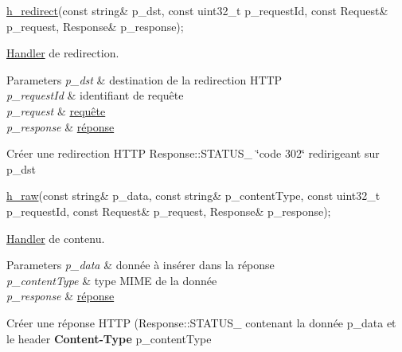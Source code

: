 \begin{DoxyItemize}
\item 
\begin{DoxyCode}
\hyperlink{classxtd_1_1network_1_1http_1_1Server_a172fc1cfb74fb3ca9930b1285ba80f9d}{h\_redirect}(\textcolor{keyword}{const} \textcolor{keywordtype}{string}& p\_dst, \textcolor{keyword}{const} uint32\_t p\_requestId, \textcolor{keyword}{const} Request& p\_request, Response& 
      p\_response); 
\end{DoxyCode}
 \hyperlink{classxtd_1_1network_1_1http_1_1Server_1_1Handler}{Handler} de redirection. 
\begin{DoxyParams}{Parameters}
{\em p\+\_\+dst} & destination de la redirection H\+T\+TP \\
\hline
{\em p\+\_\+request\+Id} & identifiant de requête \\
\hline
{\em p\+\_\+request} & \hyperlink{classxtd_1_1network_1_1http_1_1Request}{requête} \\
\hline
{\em p\+\_\+response} & \hyperlink{classxtd_1_1network_1_1http_1_1Response}{réponse}\\
\hline
\end{DoxyParams}
Créer une redirection H\+T\+TP Response\+::\+S\+T\+A\+T\+U\+S\+\_ \char`\"{}code 302\char`\"{} redirigeant sur p\+\_\+dst
\item 
\begin{DoxyCode}
\hyperlink{classxtd_1_1network_1_1http_1_1Server_a39fef0364300dcc2ff7391c821d5310d}{h\_raw}(\textcolor{keyword}{const} \textcolor{keywordtype}{string}& p\_data, \textcolor{keyword}{const} \textcolor{keywordtype}{string}& p\_contentType, \textcolor{keyword}{const} uint32\_t p\_requestId, \textcolor{keyword}{const} Request& 
      p\_request, Response& p\_response); 
\end{DoxyCode}
 \hyperlink{classxtd_1_1network_1_1http_1_1Server_1_1Handler}{Handler} de contenu. 
\begin{DoxyParams}{Parameters}
{\em p\+\_\+data} & donnée à insérer dans la réponse \\
\hline
{\em p\+\_\+content\+Type} & type M\+I\+ME de la donnée \\
\hline
{\em p\+\_\+response} & \hyperlink{classxtd_1_1network_1_1http_1_1Response}{réponse}\\
\hline
\end{DoxyParams}
Créer une réponse H\+T\+TP (Response\+::\+S\+T\+A\+T\+U\+S\+\_ contenant la donnée p\+\_\+data et le header {\bfseries Content-\/\+Type} p\+\_\+content\+Type
\item 

\end{DoxyItemize}
